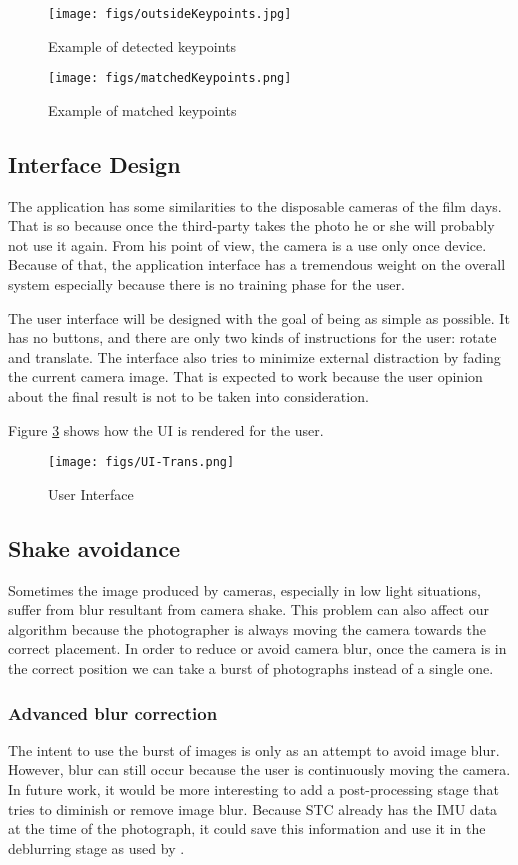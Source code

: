 \documentclass[12pt]{article}
\begin{document}
\begin{figure}[ht]
\centering
\texttt{[image: figs/outsideKeypoints.jpg]}
\caption{Example of detected keypoints}
\label{fig:keypoints}    
\end{figure}

\begin{figure}[ht]
\centering
\texttt{[image: figs/matchedKeypoints.png]}
\caption{Example of matched keypoints}
\label{fig:matched}
\end{figure}

\subsection{Interface Design}
The application has some similarities to the disposable cameras of the film days. That is so because once the third-party takes the photo he or she will probably not use it again. From his point of view, the camera is a use only once device. Because of that, the application interface has a tremendous weight on the overall system especially because there is no training phase for the user.

The user interface will be designed with the goal of being as simple as possible. It has no buttons, and there are only two kinds of instructions for the user: rotate and translate. The interface also tries to minimize external distraction by fading the current camera image. That is expected to work because the user opinion about the final result is not to be taken into consideration.


Figure \ref{fig:UI} shows how the UI is rendered for the user.
\begin{figure}[ht]
\centering
\texttt{[image: figs/UI-Trans.png]}
\caption{User Interface}
\label{fig:UI}
\end{figure}

\subsection{Shake avoidance}
Sometimes the image produced by cameras, especially in low light situations, suffer from blur resultant from camera shake. This problem can also affect our algorithm because the photographer is always moving the camera towards the correct placement. In order to reduce or avoid camera blur, once the camera is in the correct position we can take a burst of photographs instead of a single one.  

\subsubsection{Advanced blur correction}
The intent to use the burst of images is only as an attempt to avoid image blur. However, blur can still occur because the user is continuously moving the camera. In future work, it would be more interesting to add a post-processing stage that tries to diminish or remove image blur. Because STC already has the IMU data at the time of the photograph, it could save this information and use it in the deblurring stage as used by \cite{Joshi:06}.
\end{document}
